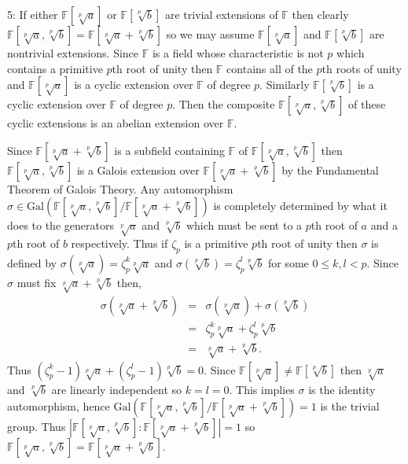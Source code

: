 \documentclass[12pt]{article}
\begin{document}
5: If either $\mathbb{F}[\sqrt[p]{a}]$ or $\mathbb{F}[\sqrt[p]{b}]$ are trivial extensions of $\mathbb{F}$ then clearly $\mathbb{F}[\sqrt[p]{a}, \sqrt[p]{b}] = \mathbb{F}[\sqrt[p]{a}+ \sqrt[p]{b}]$ so we may assume $\mathbb{F}[\sqrt[p]{a}]$ and $\mathbb{F}[\sqrt[p]{b}]$ are nontrivial extensions.  Since $\mathbb{F}$ is a field whose characteristic is not $p$ which contains a primitive $p$th root of unity then $\mathbb{F}$ contains all of the $p$th roots of unity and $\mathbb{F}[\sqrt[p]{a}]$ is a cyclic extension over $\mathbb{F}$ of degree $p$.  Similarly $\mathbb{F}[\sqrt[p]{b}]$ is a cyclic extension over $\mathbb{F}$ of degree $p$.  Then the composite $\mathbb{F}[\sqrt[p]{a}, \sqrt[p]{b}]$ of these cyclic extensions is an abelian extension over $\mathbb{F}$.

Since $\mathbb{F}[\sqrt[p]{a}+ \sqrt[p]{b}]$ is a subfield containing $\mathbb{F}$ of $\mathbb{F}[\sqrt[p]{a}, \sqrt[p]{b}]$ then $\mathbb{F}[\sqrt[p]{a}, \sqrt[p]{b}]$ is a Galois extension over $\mathbb{F}[\sqrt[p]{a} + \sqrt[p]{b}]$ by the Fundamental Theorem of Galois Theory.  Any automorphism $\sigma \in \text{Gal}(\mathbb{F}[\sqrt[p]{a}, \sqrt[p]{b}]/ \mathbb{F}[\sqrt[p]{a}+ \sqrt[p]{b}])$ is completely determined by what it does to the generators $\sqrt[p]{a}$ and $\sqrt[p]{b}$ which must be sent to a $p$th root of $a$ and a $p$th root of $b$ respectively.  Thus if $\zeta_p$ is a primitive $p$th root of unity then $\sigma$ is defined by $\sigma (\sqrt[p]{a})= \zeta_p^k \sqrt[p]{a}$ and $\sigma (\sqrt[p]{b})= \zeta_p^l \sqrt[p]{b}$ for some $0\leq k, l < p$.  Since $\sigma$ must fix $\sqrt[p]{a}+\sqrt[p]{b}$ then,
\begin{eqnarray*}
\sigma(\sqrt[p]{a}+ \sqrt[p]{b}) &=& \sigma(\sqrt[p]{a}) + \sigma(\sqrt[p]{b})\\
&=& \zeta_p^k \sqrt[p]{a} + \zeta_p^l \sqrt[p]{b}\\
&=& \sqrt[p]{a} + \sqrt[p]{b}.
\end{eqnarray*}
Thus $(\zeta_p^k-1)\sqrt[p]{a} + (\zeta_p^l -1)\sqrt[p]{b} = 0$.  Since $\mathbb{F}[\sqrt[p]{a}] \neq \mathbb{F}[\sqrt[p]{b}]$ then $\sqrt[p]{a}$ and $\sqrt[p]{b}$ are linearly independent so $k= l = 0$.  This implies $\sigma$ is the identity automorphism, hence $ \text{Gal}(\mathbb{F}[\sqrt[p]{a}, \sqrt[p]{b}]/ \mathbb{F}[\sqrt[p]{a}+ \sqrt[p]{b}]) =1$ is the trivial group.   Thus $|\mathbb{F}[\sqrt[p]{a}, \sqrt[p]{b}]: \mathbb{F}[\sqrt[p]{a} + \sqrt[p]{b}]| = 1$ so $\mathbb{F}[\sqrt[p]{a}, \sqrt[p]{b}] = \mathbb{F}[\sqrt[p]{a}+ \sqrt[p]{b}]$. \newline
\end{document}
